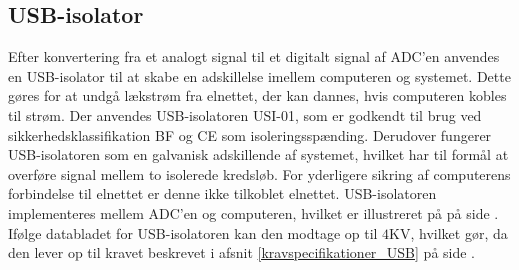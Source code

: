 \subsection{USB-isolator}\label{USB_afsnit}
Efter konvertering fra et analogt signal til et digitalt signal af ADC'en anvendes en USB-isolator til at skabe en adskillelse imellem computeren og systemet. Dette gøres for at undgå lækstrøm fra elnettet, der kan dannes, hvis computeren kobles til strøm. Der anvendes USB-isolatoren USI-01, som er godkendt til brug ved sikkerhedsklassifikation BF og CE som isoleringsspænding. Derudover fungerer USB-isolatoren som en galvanisk adskillende af systemet, hvilket har til formål at overføre signal mellem to isolerede kredsløb. For yderligere sikring af computerens forbindelse til elnettet er denne ikke tilkoblet elnettet. USB-isolatoren implementeres mellem ADC'en og computeren, hvilket er illustreret på  på side \pageref{kravblok}. \\
Ifølge databladet for USB-isolatoren kan den modtage op til $4$KV, hvilket gør, da den lever op til kravet beskrevet i afsnit \ref{kravspecifikationer_USB} på side \pageref{kravspecifikationer_USB}.
%
